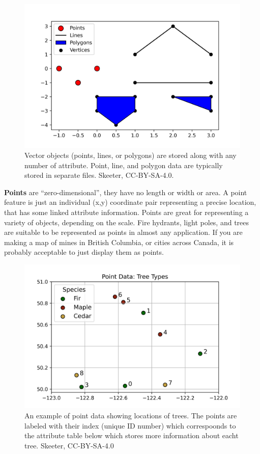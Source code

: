 \documentclass[
]{book}
\begin{document}
\begin{figure}
\includegraphics[width=0.75\linewidth]{images/03-vector-types} \caption{Vector objects (points, lines, or polygons) are stored along with any number of attribute. Point, line, and polygon data are typically stored in separate files. Skeeter, CC-BY-SA-4.0.}\label{fig:3-vector-types}
\end{figure}

\textbf{Points} are ``zero-dimensional'', they have no length or width or area. A point feature is just an individual (x,y) coordinate pair representing a precise location, that has some linked attribute information. Points are great for representing a variety of objects, depending on the scale. Fire hydrants, light poles, and trees are suitable to be represented as points in almost any application. If you are making a map of mines in British Columbia, or cities across Canada, it is probably acceptable to just display them as points.

\begin{figure}
\includegraphics[width=0.75\linewidth]{images/03-vector-points} \caption{An example of point data showing locations of trees.  The points are labeled with their index (unique ID number) which correspoonds to the attribute table below which stores more information about eacht tree. Skeeter, CC-BY-SA-4.0}\label{fig:3-vector-points}
\end{figure}
\end{document}

